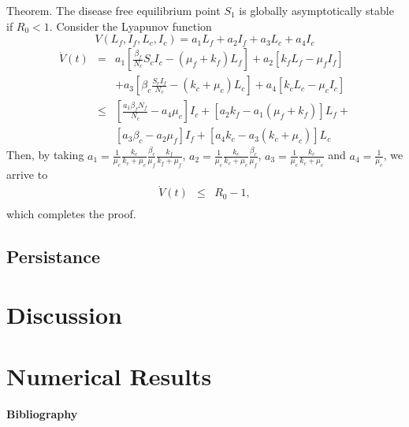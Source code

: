\documentclass[preprint,12pt]{elsarticle}
\begin{document}
\noindent Theorem. The disease free equilibrium point $S_1$ is globally asymptotically stable if $R_0<1$.
Consider the Lyapunov function
$$V(L_f,I_f,L_c,I_c)=a_1L_f+a_2I_f+a_3L_c+a_4I_c$$
$$
\begin{array}{lll}
\dot{V}(t)&=&a_1\left[\frac{\beta_f}{N_c}S_cI_c-(\mu_f+k_f)L_f\right]+a_2\left[k_fL_f-\mu_fI_f\right]\\
&&+a_3\left[ \beta_c\frac{S_cI_f}{N_c}-(k_c+\mu_c)L_c\right]+a_4\left[k_cL_c-\mu_cI_c\right]\\
&\leq& \left[\frac{a_1\beta_fN_f}{N_c}-a_4\mu_c\right]I_c+\left[a_2k_f-a_1(\mu_f+k_f)\right]L_f+\\
&&\left[a_3\beta_c-a_2\mu_f\right]I_f+\left[a_4k_c-a_3(k_c+\mu_c)\right]L_c
\end{array}
$$
Then, by taking $a_1=\frac{1}{\mu_c}\frac{k_c}{k_c+\mu_c}\frac{\beta_c}{\mu_f}\frac{k_f}{k_f+\mu_f}$, $a_2=\frac{1}{\mu_c}\frac{k_c}{k_c+\mu_c}\frac{\beta_c}{\mu_f}$, $a_3=\frac{1}{\mu_c}\frac{k_c}{k_c+\mu_c}$ and $a_4=\frac{1}{\mu_c}$, we arrive to
$$
\begin{array}{lll}
\dot{V}(t)&\leq& R_0-1,\\
\end{array}
$$
which completes the proof.

\subsection{Persistance}

\section{Discussion}

\section{Numerical Results}

    

\textbf{Bibliography}


\end{document}
